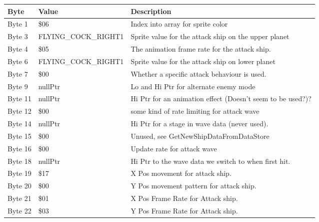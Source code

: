 \begin{figure}[H]
{\begin{adjustbox}{width=12cm}
\begin{tabular}{lll}
\toprule
 Byte    & Value                    & Description                                                        \\
\midrule
 Byte 1  & \$06                      & Index into array for sprite color                                  \\
 Byte 3  & FLYING\_COCK\_RIGHT1       & Sprite value for the attack ship on the upper planet               \\
 Byte 4  & \$05                      & The animation frame rate for the attack ship.                      \\
 Byte 6  & FLYING\_COCK\_RIGHT1       & Sprite value for the attack ship on lower planet                   \\
 Byte 7  & \$00                      & Whether a specific attack behaviour is used.                       \\
 Byte 9  & nullPtr                  & Lo and Hi Ptr for alternate enemy mode                             \\
 Byte 11 & nullPtr                  & Hi Ptr for an animation effect (Doesn't seem to be used?)?         \\
 Byte 12 & \$00                      & some kind of rate limiting for attack wave                         \\
 Byte 14 & nullPtr                  & Hi Ptr for a stage in wave data (never used).                      \\
 Byte 15 & \$00                      & Unused, see GetNewShipDataFromDataStore                            \\
 Byte 16 & \$00                      & Update rate for attack wave                                        \\
 Byte 18 & nullPtr                  & Hi Ptr to the wave data we switch to when first hit.               \\
 Byte 19 & \$17                      & X Pos movement for attack ship.                                    \\
 Byte 20 & \$00                      & Y Pos movement pattern for attack ship.                            \\
 Byte 21 & \$01                      & X Pos Frame Rate for Attack ship.                                  \\
 Byte 22 & \$03                      & Y Pos Frame Rate for Attack ship.                                  \\

\end{tabular}
\end{adjustbox}}
\end{figure}
